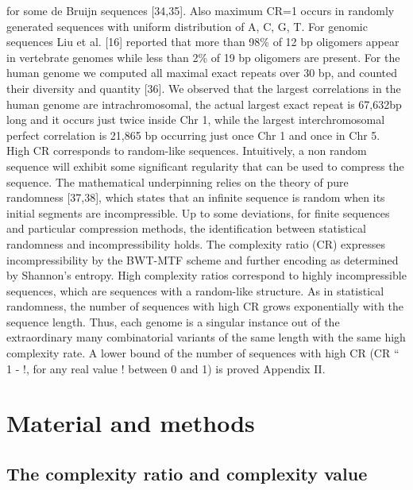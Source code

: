 for some de Bruijn sequences [34,35]. Also maximum CR=1 occurs in randomly generated
sequences with uniform distribution of A, C, G, T. For genomic sequences Liu et al. [16]
reported that more than 98\% of 12 bp oligomers appear in vertebrate genomes while less than
2\% of 19 bp oligomers are present. For the human genome we computed all maximal exact
repeats over 30 bp, and counted their diversity and quantity [36]. We observed that the largest
correlations in the human genome are intrachromosomal, the actual largest exact repeat is
67,632bp long and it occurs just twice inside Chr 1, while the largest interchromosomal
perfect correlation is 21,865 bp occurring just once Chr 1 and once in Chr 5.
High CR corresponds to random-like sequences. Intuitively, a non random sequence will
exhibit some significant regularity that can be used to compress the sequence. The
mathematical underpinning relies on the theory of pure randomness [37,38], which states that
an infinite sequence is random when its initial segments are incompressible. Up to some
deviations, for finite sequences and particular compression methods, the identification
between statistical randomness and incompressibility holds. The complexity ratio (CR)
expresses incompressibility by the BWT-MTF scheme and further encoding as determined by
Shannon's entropy. High complexity ratios correspond to highly incompressible sequences,
which are sequences with a random-like structure. As in statistical randomness, the number of
sequences with high CR grows exponentially with the sequence length. Thus, each genome is
a singular instance out of the extraordinary many combinatorial variants of the same length
with the same high complexity rate. A lower bound of the number of sequences with high CR
(CR `` 1 - !, for any real value ! between 0 and 1) is proved Appendix II.


\section{Material and methods}
\label{sec:dna_struct-matmet}

\subsection{The complexity ratio and complexity value}
\label{sec:compl-ratio-compl}

